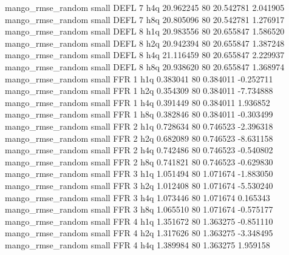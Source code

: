 mango_rmse_random      small     DEFL                 7                  h4q 20.962245 80      20.542781           2.041905
mango_rmse_random      small     DEFL                 7                  h8q 20.805096 80      20.542781           1.276917
mango_rmse_random      small     DEFL                 8                  h1q 20.983556 80      20.655847           1.586520
mango_rmse_random      small     DEFL                 8                  h2q 20.942394 80      20.655847           1.387248
mango_rmse_random      small     DEFL                 8                  h4q 21.116459 80      20.655847           2.229937
mango_rmse_random      small     DEFL                 8                  h8q 20.938620 80      20.655847           1.368974
mango_rmse_random      small      FFR                 1                  h1q  0.383041 80       0.384011          -0.252711
mango_rmse_random      small      FFR                 1                  h2q  0.354309 80       0.384011          -7.734888
mango_rmse_random      small      FFR                 1                  h4q  0.391449 80       0.384011           1.936852
mango_rmse_random      small      FFR                 1                  h8q  0.382846 80       0.384011          -0.303499
mango_rmse_random      small      FFR                 2                  h1q  0.728634 80       0.746523          -2.396318
mango_rmse_random      small      FFR                 2                  h2q  0.682089 80       0.746523          -8.631158
mango_rmse_random      small      FFR                 2                  h4q  0.742486 80       0.746523          -0.540802
mango_rmse_random      small      FFR                 2                  h8q  0.741821 80       0.746523          -0.629830
mango_rmse_random      small      FFR                 3                  h1q  1.051494 80       1.071674          -1.883050
mango_rmse_random      small      FFR                 3                  h2q  1.012408 80       1.071674          -5.530240
mango_rmse_random      small      FFR                 3                  h4q  1.073446 80       1.071674           0.165343
mango_rmse_random      small      FFR                 3                  h8q  1.065510 80       1.071674          -0.575177
mango_rmse_random      small      FFR                 4                  h1q  1.351672 80       1.363275          -0.851110
mango_rmse_random      small      FFR                 4                  h2q  1.317626 80       1.363275          -3.348495
mango_rmse_random      small      FFR                 4                  h4q  1.389984 80       1.363275           1.959158
